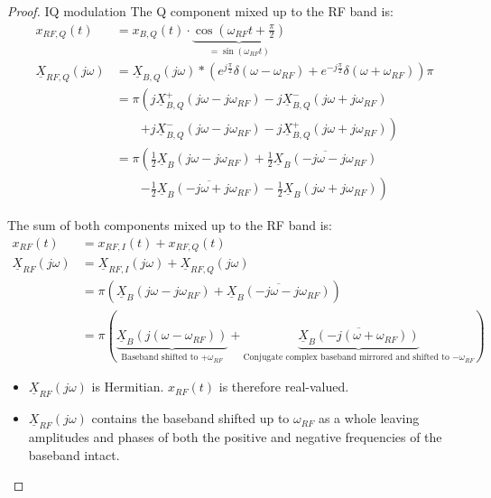 \begin{refsection}
\begin{proof}{IQ modulation}
	The \ac{Q} component mixed up to the \ac{RF} band is:
	\begin{equation}
		\begin{split}
			x_{RF,Q}(t) &= x_{B,Q}(t) \cdot \underbrace{\cos\left(\omega_{RF} t + \frac{\pi}{2}\right)}_{= \sin\left(\omega_{RF} t\right)} \\
			\underline{X}_{RF,Q}\left(j\omega\right) &= \underline{X}_{B,Q}\left(j\omega\right) * \left(e^{j\frac{\pi}{2}} \delta\left(\omega-\omega_{RF}\right) + e^{-j\frac{\pi}{2}} \delta\left(\omega+\omega_{RF}\right)\right) \pi \\
			&= \pi \left(j \underline{X}_{B,Q}^{+}\left(j\omega-j\omega_{RF}\right) - j \underline{X}_{B,Q}^{-}\left(j\omega+j\omega_{RF}\right)\right. \\ &\qquad \left. + j \underline{X}_{B,Q}^{-}\left(j\omega-j\omega_{RF}\right) - j \underline{X}_{B,Q}^{+}\left(j\omega+j\omega_{RF}\right)\right) \\
			&= \pi \left(\frac{1}{2} \underline{X}_{B}\left(j\omega-j\omega_{RF}\right) + \frac{1}{2} \overline{\underline{X}_{B}\left(-j\omega-j\omega_{RF}\right)}\right. \\ &\qquad \left. - \frac{1}{2} \overline{\underline{X}_{B}\left(-j\omega+j\omega_{RF}\right)} - \frac{1}{2} \underline{X}_{B}\left(j\omega+j\omega_{RF}\right)\right)
		\end{split}
	\end{equation}
	
	The sum of both components mixed up to the \ac{RF} band is:
	\begin{equation}
		\begin{split}
			x_{RF}(t) &= x_{RF,I}(t) + x_{RF,Q}(t) \\
			\underline{X}_{RF}\left(j\omega\right) &= \underline{X}_{RF,I}\left(j\omega\right) + \underline{X}_{RF,Q}\left(j\omega\right) \\
			 &= \pi \left( \underline{X}_{B}\left(j\omega-j\omega_{RF}\right) + \overline{\underline{X}_{B}\left(-j\omega-j\omega_{RF}\right)} \right) \\
			 &= \pi \left( \underbrace{\underline{X}_{B}\left(j\left(\omega-\omega_{RF}\right)\right)}_{\text{Baseband shifted to $+\omega_{RF}$}} + \underbrace{\overline{\underline{X}_{B}\left(-j\left(\omega+\omega_{RF}\right)\right)}}_{\text{Conjugate complex baseband mirrored and shifted to $-\omega_{RF}$}} \right) 
		\end{split}
	\end{equation}
	
	\begin{itemize}
		\item $\underline{X}_{RF}\left(j\omega\right)$ is Hermitian. $x_{RF}(t)$ is therefore real-valued.
		\item $\underline{X}_{RF}\left(j\omega\right)$ contains the baseband shifted up to $\omega_{RF}$ as a whole leaving amplitudes and phases of both the positive and negative frequencies of the baseband intact.
	\end{itemize}
\end{proof}


\end{refsection}
